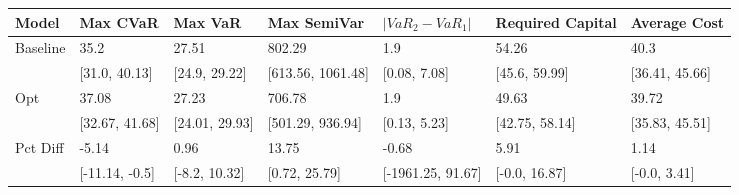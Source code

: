 \begin{tabular}{lllllll}
\toprule
   Model &       Max CVaR &        Max VaR &       Max SemiVar & $|VaR_2 - VaR_1|$ & Required Capital &   Average Cost \\
\midrule
Baseline &           35.2 &          27.51 &            802.29 &               1.9 &            54.26 &           40.3 \\
         &  [31.0, 40.13] &  [24.9, 29.22] & [613.56, 1061.48] &      [0.08, 7.08] &    [45.6, 59.99] & [36.41, 45.66] \\
     Opt &          37.08 &          27.23 &            706.78 &               1.9 &            49.63 &          39.72 \\
         & [32.67, 41.68] & [24.01, 29.93] &  [501.29, 936.94] &      [0.13, 5.23] &   [42.75, 58.14] & [35.83, 45.51] \\
Pct Diff &          -5.14 &           0.96 &             13.75 &             -0.68 &             5.91 &           1.14 \\
         & [-11.14, -0.5] &  [-8.2, 10.32] &     [0.72, 25.79] & [-1961.25, 91.67] &    [-0.0, 16.87] &   [-0.0, 3.41] \\
\bottomrule
\end{tabular}
